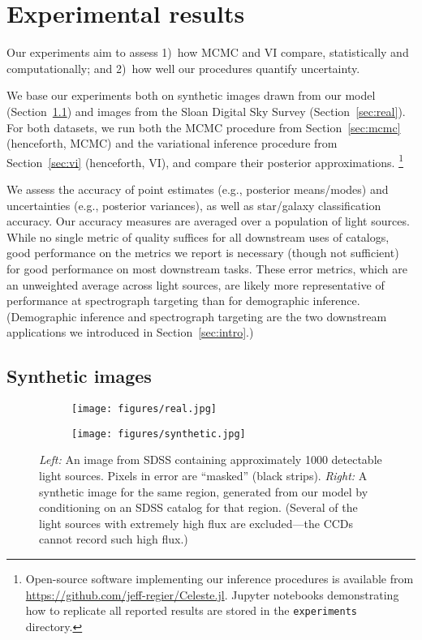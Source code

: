 \section{Experimental results}
\label{sec:experiments}
Our experiments aim to assess
1)~how MCMC and VI compare, statistically and computationally; and
2)~how well our procedures quantify uncertainty.

We base our experiments both on synthetic images drawn from our model (Section~\ref{sec:synth}) and images from the Sloan Digital Sky Survey (Section~\ref{sec:real}).
For both datasets, we run both
the MCMC procedure from Section~\ref{sec:mcmc} (henceforth, MCMC)
and the variational inference procedure from Section~\ref{sec:vi} (henceforth, VI),
and compare their posterior approximations.%
\footnote{Open-source software implementing our inference procedures is available from \url{https://github.com/jeff-regier/Celeste.jl}. Jupyter notebooks demonstrating how to replicate all reported results are stored in the \texttt{experiments} directory.}

We assess the accuracy of point estimates (e.g., posterior means/modes) and uncertainties (e.g., posterior variances), as well as star/galaxy classification accuracy.
Our accuracy measures are averaged over a population of light sources.
While no single metric of quality suffices for all downstream uses of catalogs,
good performance on the metrics we report is necessary (though not sufficient) for good performance on most downstream tasks.
These error metrics, which are an unweighted average across light sources, are likely more representative of performance at spectrograph targeting than for demographic inference. (Demographic inference and spectrograph targeting are the two downstream applications we introduced in Section~\ref{sec:intro}.)


\subsection{Synthetic images}
\label{sec:synth}

\begin{figure}[!hb]
\begin{subfigure}{.49\textwidth}
\texttt{[image: figures/real.jpg]}
\end{subfigure}
\begin{subfigure}{.49\textwidth}
\texttt{[image: figures/synthetic.jpg]}
\end{subfigure}
\caption{\textit{Left:} An image from SDSS containing approximately 1000 detectable light sources.
Pixels in error are ``masked'' (black strips).
\textit{Right:} A synthetic image for the same region, generated from our model by conditioning on an SDSS catalog for that region. (Several of the light sources with extremely high flux are excluded---the CCDs cannot record such high flux.)}
\label{real-synthetic}
\end{figure}


